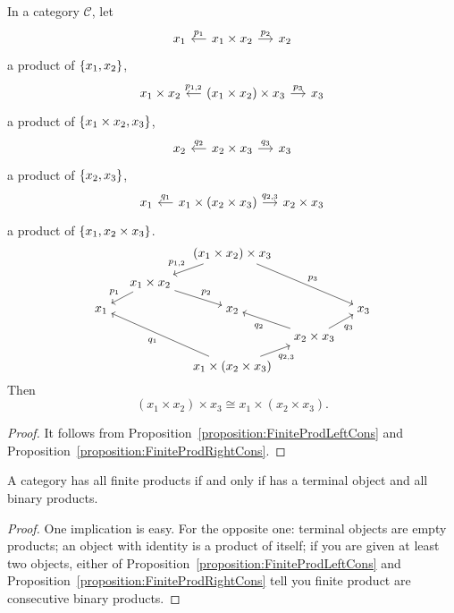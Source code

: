 \begin{corollary}\label{corollary:ProdAssoc}
  In a category \(\mathcal{C}\), let
  \[\begin{tikzcd}[sep=small]
      x_1 & x_1 \times x_2 \ar["{p_1}", l, swap] \ar["{p_2}", r] & x_2
    \end{tikzcd}\] a product of \(\left\{x_1, x_2\right\}\),
  \[\begin{tikzcd}[sep=small]
      x_1 \times x_2 & (x_1 \times x_2) \times x_3 \ar["{p_{1,2}}", l, swap]
      \ar["{p_3}", r] & x_3
    \end{tikzcd}\] a product of \(\left\{x_1 \times x_2, x_3\right\}\),
  \[\begin{tikzcd}[sep=small]
      x_2 & x_2 \times x_3 \ar["{q_2}", l, swap] \ar["{q_3}", r] & x_3
    \end{tikzcd}\] a product of \(\left\{x_2, x_3\right\}\),
  \[\begin{tikzcd}[sep=small]
      x_1 & x_1 \times (x_2 \times x_3) \ar["{q_1}", l, swap] \ar["{q_{2,3}}", r]
      & x_2 \times x_3
    \end{tikzcd}\] a product of \(\left\{x_1, x_2 \times x_3\right\}\).
  \[\begin{tikzcd}[sep=small,cramped]
      & & (x_1 \times x_2) \times x_3 \ar["{p_{1,2}}", dl, swap] \ar["{p_3}", ddrr] \\
      & x_1 \times x_2 \ar["{p_1}", dl, swap] \ar["{p_2}", dr] \\
      x_1 & & x_2 & & x_3 \\
      & & & x_2 \times x_3 \ar["{q_2}", ul] \ar["{q_3}", ur, swap] \\
      & & x_1 \times (x_2 \times x_3) \ar["{q_1}", uull] \ar["{q_{2, 3}}", ur,
      swap]
    \end{tikzcd}\] Then
  \[(x_1 \times x_2) \times x_3 \cong x_1 \times (x_2 \times x_3) .\]
\end{corollary}

\begin{proof}
  It follows from Proposition~\ref{proposition:FiniteProdLeftCons} and
  Proposition~\ref{proposition:FiniteProdRightCons}.
\end{proof}

\begin{corollary}\label{corollary:FiniteProductsIffTerminalAndBinaryProducts}
  A category has all finite products if and only if has a terminal
  object and all binary products.
\end{corollary}

\begin{proof}
  One implication is easy. For the opposite one: terminal objects are
  empty products; an object with identity is a product of itself; if you
  are given at least two objects, either of
  Proposition~\ref{proposition:FiniteProdLeftCons} and
  Proposition~\ref{proposition:FiniteProdRightCons} tell you finite
  product are consecutive binary products.
\end{proof}


